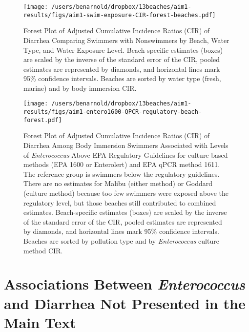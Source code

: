 \documentclass[12pt]{article}\usepackage[]{graphicx}\usepackage[]{color}
\begin{document}
\begin{landscape}
\begin{figure}[h!tb]
\begin{center}
\texttt{[image: /users/benarnold/dropbox/13beaches/aim1-results/figs/aim1-swim-exposure-CIR-forest-beaches.pdf]}
\caption{Forest Plot of Adjusted Cumulative Incidence Ratios (CIR) of Diarrhea Comparing Swimmers with Nonswimmers by Beach, Water Type, and Water Exposure Level. Beach-specific estimates (boxes) are scaled by the inverse of the standard error of the CIR, pooled estimates are represented by diamonds, and horizontal lines mark 95\% confidence intervals. Beaches are sorted by water type (fresh, marine) and by body immersion CIR. \label{fig:swimforest}}
\end{center}
\end{figure}
\end{landscape}


\begin{landscape}
\begin{figure}[h!tb]
\begin{center}
\texttt{[image: /users/benarnold/dropbox/13beaches/aim1-results/figs/aim1-entero1600-QPCR-regulatory-beach-forest.pdf]}
\caption{Forest Plot of Adjusted Cumulative Incidence Ratios (CIR) of Diarrhea Among Body Immersion Swimmers Associated with  Levels of \emph{Enterococcus} Above EPA Regulatory Guidelines for culture-based methods (EPA 1600 or Enterolert) and EPA qPCR method 1611. The reference group is swimmers below the regulatory guidelines. There are no estimates for Malibu (either method) or Goddard (culture method) because too few swimmers were exposed above the regulatory level, but those beaches still contributed to combined estimates. Beach-specific estimates (boxes) are scaled by the inverse of the standard error of the CIR, pooled estimates are represented by diamonds, and horizontal lines mark 95\% confidence intervals. Beaches are sorted by pollution type and by \textit{Enterococcus} culture method CIR.\label{fig:enteroregforest}}
\end{center}
\end{figure}
\end{landscape}

\clearpage
\section{Associations Between \emph{Enterococcus} and Diarrhea Not Presented in the Main Text}
\end{document}
